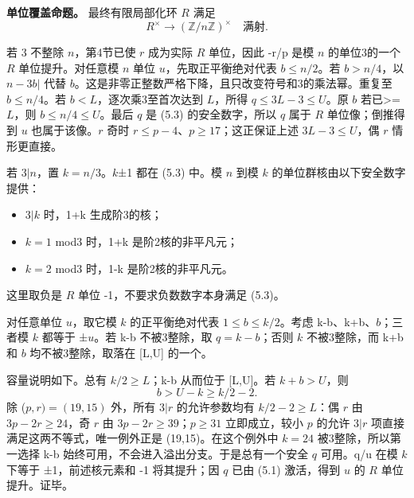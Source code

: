 \textbf{{单位覆盖命题。}} {最终有限局部化环} {\ensuremath{R}} {满足} \[
R^\times\longrightarrow(\mathbb Z/n\mathbb Z)^\times
\quad\text{满射}.
\tag{C26.5.5}
\]

{若} {3} {不整除} {\ensuremath{n}，第4节已使} {\ensuremath{r}} {成为实际} {\ensuremath{R}} {单位，因此} {-r/p} {是模} {\ensuremath{n}} {的单位3的一个} {\ensuremath{R}} {单位提升。对任意模} {\ensuremath{n}} {单位} {\ensuremath{u}，先取正平衡绝对代表} {\ensuremath{b\le n/2}。若} {\ensuremath{b>n/4}，以} {\textbar{}\ensuremath{n-3b|}} {代替} {\ensuremath{b}。这是非零正整数严格下降，且只改变符号和3的乘法幂。重复至} {\ensuremath{b\le n/4}。若} {\ensuremath{b<L}，逐次乘3至首次达到} {\ensuremath{L}，所得} {\ensuremath{q\le 3L-3\le U}。原} {\ensuremath{b}} {若已\textgreater=\ensuremath{L}，则} {\ensuremath{b\le n/4\le U}。最后} {\ensuremath{q}} {是} {(5.3)} {的安全数字，所以} {\ensuremath{q}} {属于} {\ensuremath{R}} {单位像；倒推得到} {\ensuremath{u}} {也属于该像。\ensuremath{r}} {奇时} {\ensuremath{r\le p-4}、\ensuremath{p\ge 17}；这正保证上述} {\ensuremath{3L-3\le U}，偶} {\ensuremath{r}} {情形更直接。}

{若} {\ensuremath{3|n}，置} {\ensuremath{k=n/3}。\ensuremath{k}±1} {都在} {(5.3)} {中。模} {\ensuremath{n}} {到模} {\ensuremath{k}} {的单位群核由以下安全数字提供：}

\begin{itemize}
\tightlist
\item
  {\ensuremath{3|k}} {时，1+k} {生成阶3的核；}
\item
  {\ensuremath{k=1}} {mod3} {时，1+k} {是阶2核的非平凡元；}
\item
  {\ensuremath{k=2}} {mod3} {时，1-k} {是阶2核的非平凡元。}
\end{itemize}

{这里取负是} {\ensuremath{R}} {单位} {-1，不要求负数数字本身满足} {(5.3)。}

{对任意单位} {\ensuremath{u}，取它模} {\ensuremath{k}} {的正平衡绝对代表} {\ensuremath{1\le b\le k/2}。考虑} {k-b、k+b、\ensuremath{b}；三者模} {\ensuremath{k}} {都等于} {±\ensuremath{u}。若} {k-b} {不被3整除，取} {\ensuremath{q=k-b}；否则} {\ensuremath{k}} {不被3整除，而} {k+b} {和} {\ensuremath{b}} {均不被3整除，取落在} {{[}L,U{]}} {的一个。}

{容量说明如下。总有} {\ensuremath{k/2\ge L}；k-b} {从而位于} {{[}L,U{]}。若} {\ensuremath{k+b>U}，则} \[
b>U-k\ge k/2-2.
\] {除} {(\ensuremath{p,r)=(19,15)}} {外，所有} {\ensuremath{3|r}} {的允许参数均有} {\ensuremath{k/2-2\ge L}：偶} {\ensuremath{r}} {由} {\ensuremath{3p-2r\ge 24}，奇} {\ensuremath{r}} {由} {\ensuremath{3p-2r\ge 39}；\ensuremath{p\ge 31}} {立即成立，较小} {\ensuremath{p}} {的允许} {\ensuremath{3|r}} {项直接满足这两不等式，唯一例外正是} {(19,15)。在这个例外中} {\ensuremath{k=24}} {被3整除，所以第一选择} {k-b} {始终可用，不会进入溢出分支。于是总有一个安全} {\ensuremath{q}} {可用。q/u} {在模} {\ensuremath{k}} {下等于} {±1，前述核元素和} {-1} {将其提升；因} {\ensuremath{q}} {已由} {(5.1)} {激活，得到} {\ensuremath{u}} {的} {\ensuremath{R}} {单位提升。证毕。}

